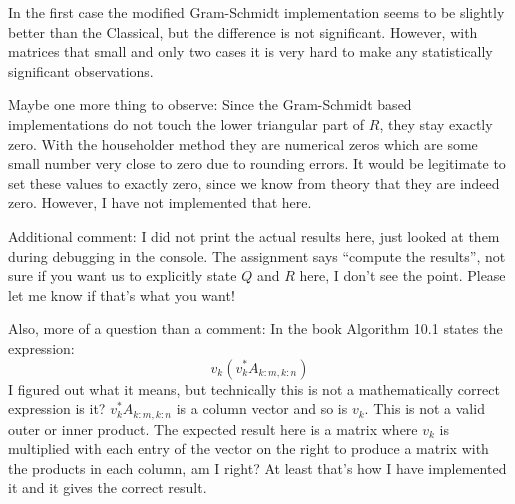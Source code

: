 \documentclass[a4paper, 11pt]{article}
\begin{document}
In the first case the modified Gram-Schmidt implementation seems to be slightly
better than the Classical, but the difference is not significant. However, with
matrices that small and only two cases it is very hard to make any
statistically significant observations.

Maybe one more thing to observe: Since the Gram-Schmidt based implementations
do not touch the lower triangular part of $R$, they stay exactly zero. With the
householder method they are numerical zeros which are some small number very
close to zero due to rounding errors. It would be legitimate to set these
values to exactly zero, since we know from theory that they are indeed zero.
However, I have not implemented that here.

Additional comment: I did not print the actual results here, just looked at
them during debugging in the console. The assignment says ``compute the
results'', not sure if you want us to explicitly state $Q$ and $R$ here, I
don't see the point. Please let me know if that's what you want!

Also, more of a question than a comment: In the book Algorithm 10.1 states the
expression:
\begin{equation}
  v_k(v_k^*A_{k:m,k:n})
\end{equation}
I figured out what it means, but technically this is not a mathematically
correct expression is it? $v_k^*A_{k:m,k:n}$ is a column vector and so is
$v_k$. This is not a valid outer or inner product. The expected result here is
a matrix where $v_k$ is multiplied with each entry of the vector on the right
to produce a matrix with the products in each column, am I right? At least
that's how I have implemented it and it gives the correct result. 
\end{document}
